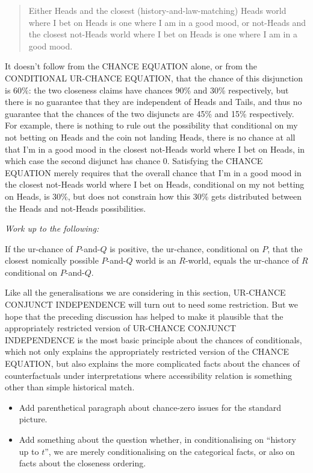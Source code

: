 \documentclass[leqno, 11pt, a5paper, openany]{article}
\begin{document}
\begin{quote} 
	Either Heads and the closest (history-and-law-matching) Heads world where I bet on Heads is one where I am in a good mood, or not-Heads and the closest not-Heads world where I bet on Heads is one where I am in a good mood. 
\end{quote}
It doesn't follow from the CHANCE EQUATION alone, or from the CONDITIONAL UR-CHANCE EQUATION, that the chance of this disjunction is 60\%: the two closeness claims have chances 90\% and 30\% respectively, but there is no guarantee that they are independent of Heads and Tails, and thus no guarantee that the chances of the two disjuncts are 45\% and 15\% respectively. For example, there is nothing to rule out the possibility that conditional on my not betting on Heads and the coin not landing Heads, there is no chance at all that I'm in a good mood in the closest not-Heads world where I bet on Heads, in which case the second disjunct has chance 0. Satisfying the CHANCE EQUATION merely requires that the overall chance that I'm in a good mood in the closest not-Heads world where I bet on Heads, conditional on my not betting on Heads, is 30\%, but does not constrain how this 30\% gets distributed between the Heads and not-Heads possibilities.

\emph{Work up to the following:}

\begin{prop}
	 \label{urconjunctindependence}
	If the ur-chance of $P$-and-$Q$ is positive, the ur-chance, conditional on $P$, that the closest nomically possible $P$-and-$Q$ world is an $R$-world, equals the ur-chance of $R$ conditional on $P$-and-$Q$. 
\end{prop}
Like all the generalisations we are considering in this section, UR-CHANCE CONJUNCT INDEPENDENCE will turn out to need some restriction. But we hope that the preceding discussion has helped to make it plausible that the appropriately restricted version of UR-CHANCE CONJUNCT INDEPENDENCE is the most basic principle about the chances of conditionals, which not only explains the appropriately restricted version of the CHANCE EQUATION, but also explains the more complicated facts about the chances of counterfactuals under interpretations where accessibility relation is something other than simple historical match.

\begin{itemize}
\item
  Add parenthetical paragraph about chance-zero issues for the standard
  picture.
\item
  Add something about the question whether, in conditionalising on
  “history up to $t$”, we are merely conditionalising on the
  categorical facts, or also on facts about the closeness ordering.
\end{itemize}
\end{document}
